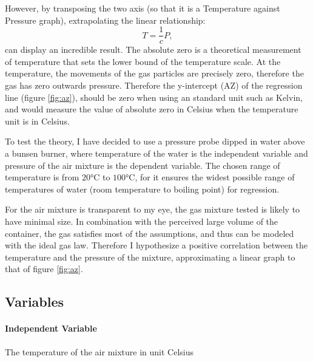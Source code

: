 \documentclass[a4paper,12pt]{article}
\begin{document}
However, by transposing the two axis (so that it is a Temperature against Pressure graph), extrapolating the linear relationship:
\[
    T = \frac{1}{c}P,
\]
can display an incredible result. The absolute zero is a theoretical measurement of temperature that sets the lower bound of the temperature scale. At the temperature, the movements of the gas particles are precisely zero, therefore the gas has zero outwards pressure. Therefore the y-intercept (AZ) of the regression line (figure \ref{fig:az}), should be zero when using an standard unit such as Kelvin, and would measure the value of absolute zero in Celsius when the temperature unit is in Celsius.




To test the theory, I have decided to use a pressure probe dipped in water above a bunsen burner, where temperature of the water is the independent variable and pressure of the air mixture is the dependent variable. The chosen range of temperature is from $20\si{\celsius}$ to $100\si{\celsius}$, for it ensures the widest possible range of temperatures of water (room temperature to boiling point) for regression.

For the air mixture is transparent to my eye, the gas mixture tested is likely to have minimal size. In combination with the perceived large volume of the container, the gas satisfies most of the assumptions, and thus can be modeled with the ideal gas law. Therefore I hypothesize a positive correlation between the temperature and the pressure of the mixture, approximating a linear graph to that of figure \ref{fig:az}.

\subsection{Variables}
\paragraph{Independent Variable}
The temperature of the air mixture in unit Celsius
\end{document}
